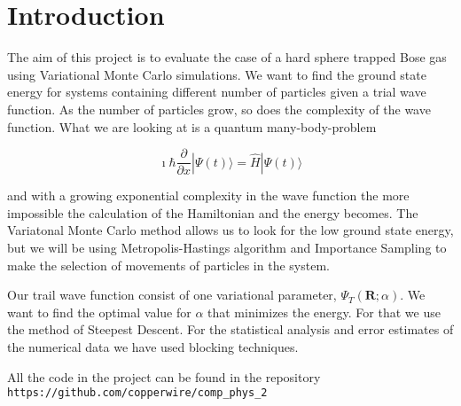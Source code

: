 \section{Introduction}
The aim of this project is to evaluate the case of a hard sphere trapped Bose gas using Variational Monte Carlo simulations. We want to find the ground state energy for systems containing different number of particles given a trial wave function. As the number of particles grow, so does the complexity of the wave function.
What we are looking at is a quantum many-body-problem

$$\imath \hbar \frac{\partial}{\partial x} |\Psi (t)\rangle = \hat{H} |\Psi (t)\rangle$$

and with a growing exponential complexity in the wave function the more impossible the calculation of the Hamiltonian and the energy becomes. The Variatonal Monte Carlo method allows us to look for the low ground state energy, but we will be using Metropolis-Hastings algorithm and Importance Sampling to make the selection of movements of particles in the system. 

Our trail wave function consist of one variational parameter, $\Psi_T(\mathbf{R};\alpha)$. We want to find the optimal value for $\alpha$ that minimizes the energy. For that we use the method of Steepest Descent. 
For the statistical analysis and error estimates of the numerical data we have used blocking techniques.  

All the code in the project can be found in the repository \lstinline{https://github.com/copperwire/comp_phys_2}

